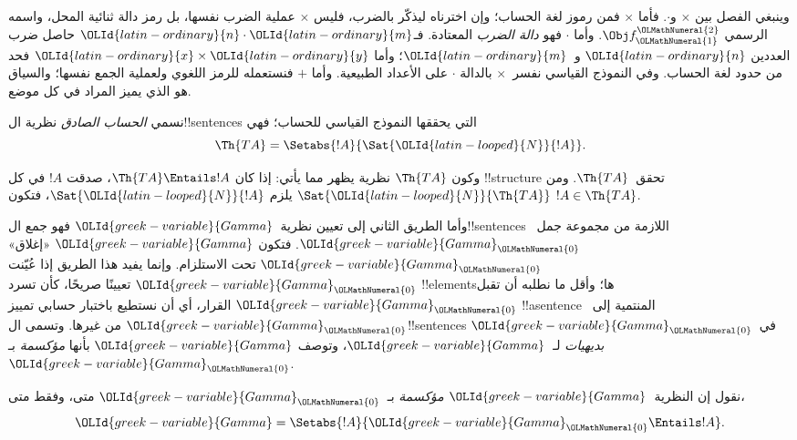 \documentclass[../../../include/open-logic-section]{subfiles}
\begin{document}
وينبغي الفصل بين $\times$ و$\cdot$. فأما $\times$
فمن رموز لغة الحساب؛ وإن اخترناه ليذكّر بالضرب،
فليس $\times$ عملية الضرب نفسها، بل رمز دالة ثنائية
المحل، واسمه الرسمي $\Obj f^\OLMathNumeral{2}_\OLMathNumeral{1}$. وأما $\cdot$
فهو \emph{دالة الضرب} المعتادة. فـ$\OLId{latin-ordinary}{n}\cdot \OLId{latin-ordinary}{m}$ حاصل
ضرب العددين $\OLId{latin-ordinary}{n}$ و~$\OLId{latin-ordinary}{m}$؛ وأما $\OLId{latin-ordinary}{x}\times \OLId{latin-ordinary}{y}$ فحد من
حدود لغة الحساب. وفي النموذج القياسي نفسر~$\times$
بالدالة $\cdot$ على الأعداد الطبيعية. وأما $+$
فنستعمله للرمز اللغوي ولعملية الجمع نفسها؛ والسياق
هو الذي يميز المراد في كل موضع.

\begin{defn}
نسمي \emph{الحساب الصادق} نظرية ال!!{sentence}s التي يحققها
النموذج القياسي للحساب؛ فهي
\[
\Th{TA} = \Setabs{!A}{\Sat{\OLId{latin-looped}{N}}{!A}}.
\]
\end{defn}

وكون $\Th{TA}$ نظرية يظهر مما يأتي: إذا كان
$\Th{TA}\Entails !A$، صدقت $!A$ في كل !!{structure}
تحقق~$\Th{TA}$. ومن $\Sat{\OLId{latin-looped}{N}}{\Th{TA}}$ يلزم
$\Sat{\OLId{latin-looped}{N}}{!A}$، فتكون $!A\in\Th{TA}$.

وأما الطريق الثاني إلى تعيين نظرية~$\OLId{greek-variable}{Gamma}$ فهو جمع
ال!!{sentence}s اللازمة من مجموعة جمل~$\OLId{greek-variable}{Gamma}_\OLMathNumeral{0}$.
فتكون $\OLId{greek-variable}{Gamma}$ «إغلاق» $\OLId{greek-variable}{Gamma}_\OLMathNumeral{0}$ تحت الاستلزام.
وإنما يفيد هذا الطريق إذا عُيّنت $\OLId{greek-variable}{Gamma}_\OLMathNumeral{0}$ تعيينًا
صريحًا، كأن تسرد !!{element}sها؛ وأقل ما نطلبه أن
تقبل $\OLId{greek-variable}{Gamma}_\OLMathNumeral{0}$ القرار، أي أن نستطيع باختبار حسابي
تمييز !!a{sentence} المنتمية إلى~$\OLId{greek-variable}{Gamma}_\OLMathNumeral{0}$ من غيرها.
وتسمى ال!!{sentence}s في~$\OLId{greek-variable}{Gamma}_\OLMathNumeral{0}$ \emph{بديهيات}
لـ~$\OLId{greek-variable}{Gamma}$، وتوصف $\OLId{greek-variable}{Gamma}$ بأنها \emph{مؤكسمة}
بـ~$\OLId{greek-variable}{Gamma}_\OLMathNumeral{0}$.

\begin{defn}
نقول إن النظرية~$\OLId{greek-variable}{Gamma}$ \emph{مؤكسمة} بـ~$\OLId{greek-variable}{Gamma}_\OLMathNumeral{0}$ متى، وفقط متى،
\[
\OLId{greek-variable}{Gamma} = \Setabs{!A}{\OLId{greek-variable}{Gamma}_\OLMathNumeral{0} \Entails !A}.
\]
\end{defn}
\end{document}

